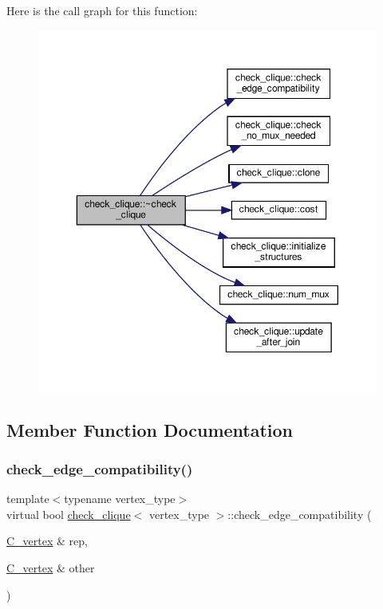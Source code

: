 Here is the call graph for this function\+:
\nopagebreak
\begin{figure}[H]
\begin{center}
\leavevmode
\includegraphics[width=350pt]{d9/d11/structcheck__clique_ab59f1c6c2117663f375f89fc98a145d7_cgraph}
\end{center}
\end{figure}


\subsection{Member Function Documentation}
\mbox{\label{structcheck__clique_a5d5ad28e723a12d105f578360959ec53}} 
\subsubsection{\texorpdfstring{check\+\_\+edge\+\_\+compatibility()}{check\_edge\_compatibility()}}
{\footnotesize\ttfamily template$<$typename vertex\+\_\+type$>$ \\
virtual bool \hyperlink{structcheck__clique}{check\+\_\+clique}$<$ vertex\+\_\+type $>$\+::check\+\_\+edge\+\_\+compatibility (\begin{DoxyParamCaption}\item[{\hyperlink{clique__covering__graph_8hpp_a9cb45047ea8c5ed95a8cfa90494345aa}{C\+\_\+vertex} \&}]{rep,  }\item[{\hyperlink{clique__covering__graph_8hpp_a9cb45047ea8c5ed95a8cfa90494345aa}{C\+\_\+vertex} \&}]{other }\end{DoxyParamCaption})\hspace{0.3cm}{\ttfamily [pure virtual]}}



